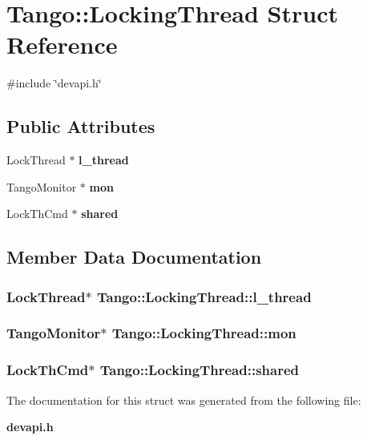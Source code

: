 \section{Tango\-:\-:Locking\-Thread Struct Reference}
\label{structTango_1_1LockingThread}


{\ttfamily \#include \char`\"{}devapi.\-h\char`\"{}}

\subsection*{Public Attributes}
\begin{DoxyCompactItemize}
\item 
Lock\-Thread $\ast$ {\bf l\-\_\-thread}
\item 
Tango\-Monitor $\ast$ {\bf mon}
\item 
Lock\-Th\-Cmd $\ast$ {\bf shared}
\end{DoxyCompactItemize}


\subsection{Member Data Documentation}
\subsubsection[{l\-\_\-thread}]{\setlength{\rightskip}{0pt plus 5cm}Lock\-Thread$\ast$ Tango\-::\-Locking\-Thread\-::l\-\_\-thread}\label{structTango_1_1LockingThread_a98fd861b6d8fcddf32da3be51fc1ac4b}
\subsubsection[{mon}]{\setlength{\rightskip}{0pt plus 5cm}Tango\-Monitor$\ast$ Tango\-::\-Locking\-Thread\-::mon}\label{structTango_1_1LockingThread_ae8e7851b01b8c8a9a34c8044cb9ca3a9}
\subsubsection[{shared}]{\setlength{\rightskip}{0pt plus 5cm}Lock\-Th\-Cmd$\ast$ Tango\-::\-Locking\-Thread\-::shared}\label{structTango_1_1LockingThread_a3a3fe5fd038680368a3f32e2d190bc80}


The documentation for this struct was generated from the following file\-:\begin{DoxyCompactItemize}
\item 
{\bf devapi.\-h}\end{DoxyCompactItemize}
